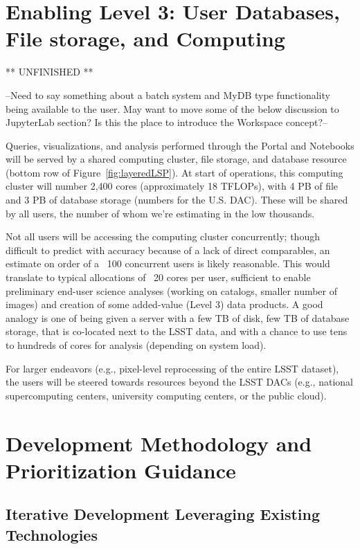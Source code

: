 \documentclass[DM,lsstdraft,toc]{lsstdoc}
\begin{document}
\section{Enabling Level 3: User Databases, File storage, and Computing}

** UNFINISHED **

--Need to say something about a batch system and MyDB type functionality being 
available to the user. May want to move some of the below discussion to
JupyterLab section? Is this the place to introduce the Workspace concept?--

Queries, visualizations, and analysis performed through the Portal and
Notebooks will be served by a shared computing cluster, file storage, and
database resource (bottom row of Figure~\ref{fig:layeredLSP}).  At start of operations,
this computing cluster will number 2,400 cores (approximately 18 TFLOPs),
with 4 PB of file and 3 PB of database storage (numbers for the U.S.  DAC). 
These will be shared by all users, the number of whom we’re estimating in
the low thousands.

Not all users will be accessing the computing cluster concurrently; though
difficult to predict with accuracy because of a lack of direct comparables,
an estimate on order of a ~100 concurrent users is likely reasonable.  This
would translate to typical allocations of ~20 cores per user, sufficient to
enable preliminary end-user science analyses (working on catalogs, smaller
number of images) and creation of some added-value (Level 3) data products. 
A good analogy is one of being given a server with a few TB of disk, few TB
of database storage, that is co-located next to the LSST data, and with a
chance to use tens to hundreds of cores for analysis (depending on system
load).

For larger endeavors (e.g., pixel-level reprocessing of the entire LSST
dataset), the users will be steered towards resources beyond the LSST DACs
(e.g., national supercomputing centers, university computing centers, or the
public cloud).

\section{Development Methodology and Prioritization Guidance}

\subsection{Iterative Development Leveraging Existing Technologies }
\end{document}
